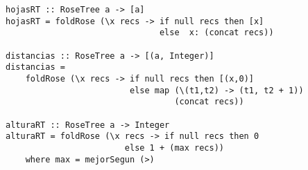 \begin{centrado}
    \begin{verbatim}
hojasRT :: RoseTree a -> [a]
hojasRT = foldRose (\x recs -> if null recs then [x]
                               else  x: (concat recs))

distancias :: RoseTree a -> [(a, Integer)]
distancias = 
    foldRose (\x recs -> if null recs then [(x,0)]
                         else map (\(t1,t2) -> (t1, t2 + 1)) 
                                  (concat recs))

alturaRT :: RoseTree a -> Integer
alturaRT = foldRose (\x recs -> if null recs then 0
                        else 1 + (max recs))
    where max = mejorSegun (>)
    \end{verbatim}
\end{centrado}